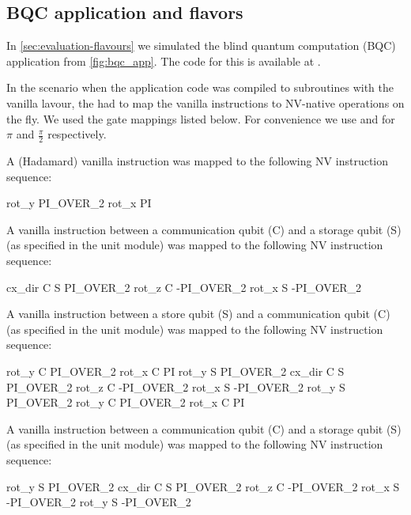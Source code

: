 \subsection{BQC application and flavors}
In \cref{sec:evaluation-flavours} we simulated the blind quantum computation
(BQC) application from \cref{fig:bqc_app}. The code for this is available at
\cite{git_squidasm}.

In the scenario when the application code was compiled to subroutines with the
vanilla lavour, the \QNPU had to map the vanilla instructions to NV-native
operations on the fly. We used the gate mappings listed below. For
convenience we use  and  for $\pi$ and $\frac{\pi}{2}$
respectively.

A  (Hadamard) vanilla instruction was mapped to the following NV instruction sequence:
\begin{nqcode}
  rot_y PI_OVER_2
  rot_x PI\end{nqcode}

A  vanilla instruction between a communication qubit (C) and a storage
qubit (S) (as specified in the unit module) was mapped to the following NV
instruction sequence:
\begin{nqcode}
  cx_dir C S PI_OVER_2
  rot_z C -PI_OVER_2
  rot_x S -PI_OVER_2\end{nqcode}

A  vanilla instruction between a store qubit (S) and a communication
qubit (C) (as specified in the unit module) was mapped to the following NV
instruction sequence:
\begin{nqcode}
  rot_y C PI_OVER_2
  rot_x C PI
  rot_y S PI_OVER_2
  cx_dir C S PI_OVER_2
  rot_z C -PI_OVER_2
  rot_x S -PI_OVER_2
  rot_y S PI_OVER_2
  rot_y C PI_OVER_2
  rot_x C PI\end{nqcode}

A  vanilla instruction between a communication qubit (C) and a storage
qubit (S) (as specified in the unit module) was mapped to the following NV
instruction sequence:
\begin{nqcode}
  rot_y S PI_OVER_2
  cx_dir C S PI_OVER_2
  rot_z C -PI_OVER_2
  rot_x S -PI_OVER_2
  rot_y S -PI_OVER_2\end{nqcode}


\begin{xstretch}
\printbibliography[heading=subbibintoc,title={References},notcategory=noprint]
\end{xstretch}
